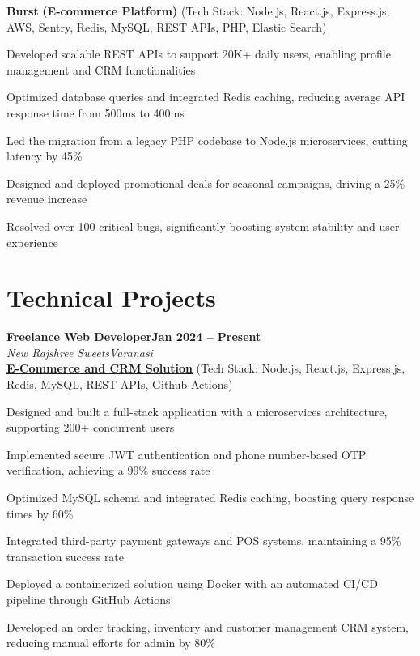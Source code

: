 \documentclass[letterpaper, 10pt]{article}
\newcommand{\heading}[2]{ \hspace{6pt}#1\hfill#2\\[0.8pt] }
\newcommand{\headingBf}[2]{ \heading{\textbf{#1}}{\textbf{#2}} }
\newcommand{\headingIt}[2]{ \heading{\textit{#1}}{\textit{#2}} }
\newenvironment{resume_list}{
\vspace{-5pt}
\begin{itemize}[itemsep=-3pt, parsep=0.2pt, leftmargin=20pt] }{ \end{itemize}
\vspace{-4pt}
}
\begin{document}
	\hspace{10pt}\textbf{Burst} \textbf{(E-commerce Platform)} \small{(Tech Stack: Node.js, React.js, Express.js, AWS, Sentry, Redis, MySQL, REST APIs, PHP, Elastic Search)}
	\vspace{1pt}
	\begin{resume_list}
		\item Developed scalable REST APIs to support 20K+ daily users, enabling profile
		management and CRM functionalities \item Optimized database queries and integrated
		Redis caching, reducing average API response time from 500ms to 400ms \item
		Led the migration from a legacy PHP codebase to Node.js microservices, cutting
		latency by 45\% \item Designed and deployed promotional deals for seasonal
		campaigns, driving a 25\% revenue increase \item Resolved over 100 critical
		bugs, significantly boosting system stability and user experience
	\end{resume_list}

	\section{Technical Projects}
	\headingBf{Freelance Web Developer}{Jan 2024 -- Present}
	\vspace{1pt}
	\headingIt{New Rajshree Sweets}{Varanasi}
	\vspace{2pt}
	\hspace{10pt}\textbf{\href{https://newrajshreesweets.com}{\underline{E-Commerce and CRM Solution}}}
	\small{(Tech Stack: Node.js, React.js, Express.js, Redis, MySQL, REST APIs, Github Actions)}
	\vspace{1pt}
	\begin{resume_list}
		\item Designed and built a full-stack application with a microservices architecture,
		supporting 200+ concurrent users \item Implemented secure JWT authentication
		and phone number-based OTP verification, achieving a 99\% success rate \item
		Optimized MySQL schema and integrated Redis caching, boosting query response
		times by 60\% \item Integrated third-party payment gateways and POS systems,
		maintaining a 95\% transaction success rate \item Deployed a containerized solution
		using Docker with an automated CI/CD pipeline through GitHub Actions \item Developed
		an order tracking, inventory and customer management CRM system, reducing manual
		efforts for admin by 80\%
	\end{resume_list}
\end{document}
